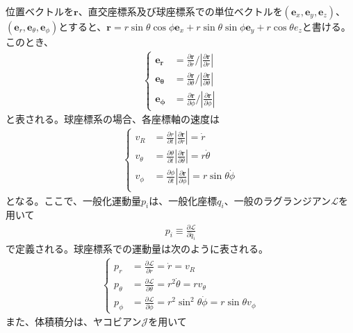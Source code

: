 位置ベクトルを$\bm r$、直交座標系及び球座標系での単位ベクトルを$(\bm e_x, \bm e_y, \bm e_z)$、$(\bm e_r, \bm e_{\theta}, \bm e_{\phi})$とすると、$\bm r = r\sin{\theta} \cos{\phi} \bm e_x + r\sin{\theta} \sin{\phi} \bm e_y + r\cos{\theta} e_z$と書ける。このとき、
\begin{align}
	\begin{cases}
		\bm{e_r} &= \frac{\partial \bm r}{\partial r} / \left| \frac{\partial \bm r}{\partial r}\right| \\
		\bm{e_{\theta}} &= \frac{\partial \bm r}{\partial \theta} / \left| \frac{\partial \bm r}{\partial \theta}\right| \\
		\bm{e_{\phi}} &= \frac{\partial \bm r}{\partial \phi} / \left| \frac{\partial \bm r}{\partial \phi}\right|
	\end{cases}
\end{align}
と表される。球座標系の場合、各座標軸の速度は
\begin{align}
	\begin{cases}
		v_R &= \frac{\partial r}{\partial t}|\frac{\partial \bm r}{\partial r}| = \dot{r}\\
		v_{\theta} &= \frac{\partial \theta}{\partial t}|\frac{\partial \bm r}{\partial \theta}| = r\dot{\theta}\\
		v_{\phi} &= \frac{\partial \phi}{\partial t}|\frac{\partial \bm r}{\partial \phi}| = r\sin\theta\dot{\phi}\\
	\end{cases}
\end{align}
となる。ここで、一般化運動量$p_i$は、一般化座標$q_i$、一般のラグランジアン$\mathcal{L}$を用いて
\begin{align}
	p_i \equiv \frac{\partial \mathcal{L}}{\partial \dot{q_i}}
\end{align}
で定義される。球座標系での運動量は次のように表される。
\begin{align}
	\begin{cases}
		p_r &= \frac{\partial \mathcal{L}}{\partial r} = \dot{r} = v_R \\
		p_{\theta} &= \frac{\partial \mathcal{L}}{\partial \theta} = r^2\dot{\theta} = r v_{\theta} \\
		p_{\phi} &= \frac{\partial \mathcal{L}}{\partial \phi} = r^2\sin^2\theta\dot{\phi} = r\sin\theta v_{\phi} \label{momenta}
	\end{cases}
\end{align}
また、体積積分は、ヤコビアン$\mathcal{J}$を用いて

